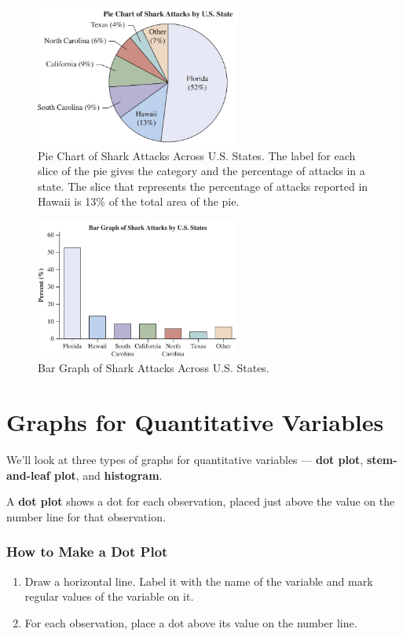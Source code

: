 \begin{figure}[h!]
\centering
\includegraphics[width=0.6\textwidth]{figures/pie_chart.jpg}
\caption{Pie Chart of Shark Attacks Across U.S. States. The label for each slice of the pie gives the category and the percentage of attacks in a state. The slice that represents the percentage of attacks reported in Hawaii is 13\% of the total area of the pie.}
\label{fig:pie_chart.jpg}
\end{figure}

\begin{figure}[h!]
\centering
\includegraphics[width=0.6\textwidth]{figures/bar_chart.jpg}
\caption{Bar Graph of Shark Attacks Across U.S. States.}
\label{fig:bar_chart.jpg}
\end{figure}

\section{Graphs for Quantitative Variables}
We’ll look at three types of graphs for quantitative variables --- \textbf{dot plot}, \textbf{stem-and-leaf plot}, and \textbf{histogram}.

A \textbf{dot plot} shows a dot for each observation, placed just above the value on the number line for that observation.

\subsubsection*{How to Make a Dot Plot}
\begin{enumerate}
    \item Draw a horizontal line. Label it with the name of the variable and mark regular values of the variable on it.
    \item For each observation, place a dot above its value on the number line.
\end{enumerate}

